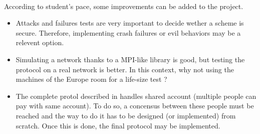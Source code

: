 \documentclass{article}
\begin{document}
\paragraph{}
According to student’s pace, some improvements can be added to the project. 
\begin{itemize}
    \item Attacks and failures tests are very important to decide wether a scheme is secure. Therefore, implementing crash failures or evil behaviors may be a relevent option.
    \item Simulating a network thanks to a MPI-like library is good, but testing the protocol on a real network is better. In this context, why not using the machines of the Europe room for a life-size test ?
    \item The complete protol described in \cite{crypto} handles shared account (multiple people can pay with same account). To do so, a concensus between these people must be reached and the way to do it has to be designed (or implemented) from scratch. Once this is done, the final protocol may be implemented.
\end{itemize}


\end{document}
